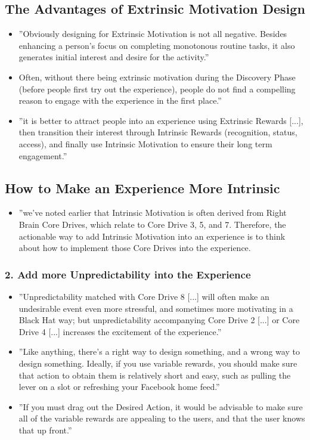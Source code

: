 \subsection{The Advantages of Extrinsic Motivation Design}
    \begin{itemize}
        \item ''Obviously designing for Extrinsic Motivation is not all negative. Besides enhancing a person's focus on completing monotonous routine tasks, it also generates initial interest and desire for the activity.''
        \item Often, without there being extrinsic motivation during the Discovery Phase (before people first try out the experience), people do not find a compelling reason to engage with the experience in the first place.''
        \item ''it is better to attract people into an experience using Extrinsic Rewards [...], then transition their interest through Intrinsic Rewards (recognition, status, access), and finally use Intrinsic Motivation to ensure their long term engagement.''
    \end{itemize}
    
\subsection{How to Make an Experience More Intrinsic}
    \begin{itemize}
        \item ''we've noted earlier that Intrinsic Motivation is often derived from Right Brain Core Drives, which relate to Core Drive 3, 5, and 7. Therefore, the actionable way to add Intrinsic Motivation into an experience is to think about how to implement those Core Drives into the experience.
    \end{itemize}

\subsubsection{2. Add more Unpredictability into the Experience}
    \begin{itemize}
        \item ''Unpredictability matched with Core Drive 8 [...] will often make an undesirable event even more stressful, and sometimes more motivating in a Black Hat way; but unpredictability accompanying Core Drive 2 [...] or Core Drive 4 [...] increases the excitement of the experience.''
        \item ''Like anything, there's a right way to design something, and a wrong way to design something. Ideally, if you use variable rewards, you should make sure that action to obtain them is relatively short and easy, such as pulling the lever on a slot or refreshing your Facebook home feed.''
        \item ''If you must drag out the Desired Action, it would be advisable to make sure all of the variable rewards are appealing to the users, and that the user knows that up front.''
    \end{itemize}
    
